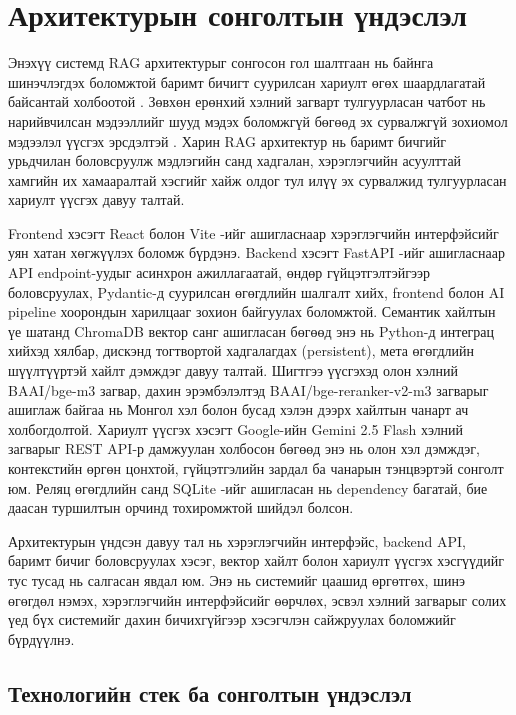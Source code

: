 \section{Архитектурын сонголтын үндэслэл}

Энэхүү системд RAG архитектурыг сонгосон гол шалтгаан нь байнга шинэчлэгдэх боломжтой баримт бичигт суурилсан хариулт өгөх шаардлагатай байсантай холбоотой \cite{rag_survey, grounded_generation}. Зөвхөн ерөнхий хэлний загварт тулгуурласан чатбот нь нарийвчилсан мэдээллийг шууд мэдэх боломжгүй бөгөөд эх сурвалжгүй зохиомол мэдээлэл үүсгэх эрсдэлтэй \cite{llm_limitations, hallucination_survey}. Харин RAG архитектур нь баримт бичгийг урьдчилан боловсруулж мэдлэгийн санд хадгалан, хэрэглэгчийн асуулттай хамгийн их хамааралтай хэсгийг хайж олдог тул илүү эх сурвалжид тулгуурласан хариулт үүсгэх давуу талтай.

Frontend хэсэгт React \cite{react_docs} болон Vite \cite{vite_docs}-ийг ашигласнаар хэрэглэгчийн интерфэйсийг уян хатан хөгжүүлэх боломж бүрдэнэ. Backend хэсэгт FastAPI \cite{fastapi}-ийг ашигласнаар API endpoint-уудыг асинхрон ажиллагаатай, өндөр гүйцэтгэлтэйгээр боловсруулах, Pydantic-д суурилсан өгөгдлийн шалгалт хийх, frontend болон AI pipeline хоорондын харилцааг зохион байгуулах боломжтой. Семантик хайлтын үе шатанд ChromaDB вектор санг \cite{chromadb} ашигласан бөгөөд энэ нь Python-д интеграц хийхэд хялбар, дискэнд тогтвортой хадгалагдах (persistent), мета өгөгдлийн шүүлтүүртэй хайлт дэмждэг давуу талтай. Шигтгээ үүсгэхэд олон хэлний BAAI/bge-m3 \cite{bge_m3} загвар, дахин эрэмбэлэлтэд BAAI/bge-reranker-v2-m3 \cite{bge_reranker} загварыг ашиглаж байгаа нь Монгол хэл болон бусад хэлэн дээрх хайлтын чанарт ач холбогдолтой. Хариулт үүсгэх хэсэгт Google-ийн Gemini 2.5 Flash хэлний загварыг \cite{gemini_report, gemini_api} REST API-р дамжуулан холбосон бөгөөд энэ нь олон хэл дэмждэг, контекстийн өргөн цонхтой, гүйцэтгэлийн зардал ба чанарын тэнцвэртэй сонголт юм. Реляц өгөгдлийн санд SQLite \cite{sqlite}-ийг ашигласан нь dependency багатай, бие даасан туршилтын орчинд тохиромжтой шийдэл болсон.

Архитектурын үндсэн давуу тал нь хэрэглэгчийн интерфэйс, backend API, баримт бичиг боловсруулах хэсэг, вектор хайлт болон хариулт үүсгэх хэсгүүдийг тус тусад нь салгасан явдал юм. Энэ нь системийг цаашид өргөтгөх, шинэ өгөгдөл нэмэх, хэрэглэгчийн интерфэйсийг өөрчлөх, эсвэл хэлний загварыг солих үед бүх системийг дахин бичихгүйгээр хэсэгчлэн сайжруулах боломжийг бүрдүүлнэ.

\subsection{Технологийн стек ба сонголтын үндэслэл}

